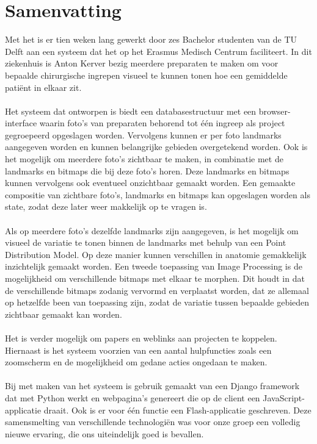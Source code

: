 \section{Samenvatting}

Met het \casamproject is er tien weken lang gewerkt door zes Bachelor studenten van de TU Delft aan een 
systeem dat het \casamproject op het Erasmus Medisch Centrum faciliteert. 
In dit ziekenhuis is Anton Kerver bezig meerdere preparaten te maken om voor bepaalde chirurgische ingrepen visueel te kunnen tonen hoe een gemiddelde pati\"{e}nt in elkaar zit.
\\
\\
Het systeem dat ontworpen is biedt een databasestructuur met een browser-interface waarin foto's van 
preparaten behorend tot \'{e}\'{e}n ingreep als project gegroepeerd opgeslagen worden. 
Vervolgens kunnen er per foto landmarks aangegeven worden en kunnen belangrijke gebieden overgetekend worden.
Ook is het mogelijk om meerdere foto's zichtbaar te maken, in combinatie met de landmarks en bitmaps die bij deze foto's horen.
Deze landmarks en bitmaps kunnen vervolgens ook eventueel onzichtbaar gemaakt worden.
Een gemaakte compositie van zichtbare foto's, landmarks en bitmaps kan opgeslagen worden als state, zodat deze later weer makkelijk op te vragen is.
\\
\\
Als op meerdere foto's dezelfde landmarks zijn aangegeven, is het mogelijk om visueel de variatie te tonen binnen de landmarks met behulp van een Point Distribution Model. 
Op deze manier kunnen verschillen in anatomie gemakkelijk inzichtelijk gemaakt worden.
Een tweede toepassing van Image Processing is de mogelijkheid om verschillende bitmaps met elkaar te morphen. 
Dit houdt in dat de verschillende bitmaps zodanig vervormd en verplaatst worden, dat ze allemaal op hetzelfde been van toepassing zijn,
zodat de variatie tussen bepaalde gebieden zichtbaar gemaakt kan worden.
\\
\\
Het is verder mogelijk om papers en weblinks aan projecten te koppelen.
Hiernaast is het systeem voorzien van een aantal hulpfuncties zoals een zoomscherm en de mogelijkheid om gedane acties ongedaan te maken. 
\\
\\
Bij met maken van het systeem is gebruik gemaakt van een Django framework dat met Python werkt en webpagina's genereert die op de client een JavaScript-applicatie draait. 
Ook is er voor \'{e}\'{e}n functie een Flash-applicatie geschreven.
Deze samensmelting van verschillende technologi\"{e}n was voor onze groep een volledig nieuwe ervaring, die 
ons uiteindelijk goed is bevallen.
